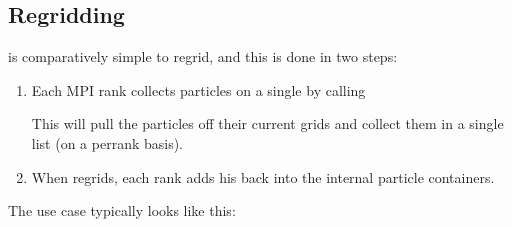 \documentclass[letterpaper,10pt,english]{sphinxmanual}
\begin{document}
\subsection{Regridding}
\label{\detokenize{Source/Particles:regridding}}
\sphinxAtStartPar
{} is comparatively simple to regrid, and this is done in two steps:
\begin{enumerate}
%
\item {} 
\sphinxAtStartPar
Each MPI rank collects  particles on a single  by calling

\begin{sphinxVerbatim}[commandchars=\\\{\},formatcom=\scriptsize]
  
\end{sphinxVerbatim}

\sphinxAtStartPar
This will pull the particles off their current grids and collect them in a single list (on a per\sphinxhyphen{}rank basis).

\item {} 
\sphinxAtStartPar
When  regrids, each rank adds his  back into the internal particle containers.

\end{enumerate}

\sphinxAtStartPar
The use case typically looks like this:
\end{document}
